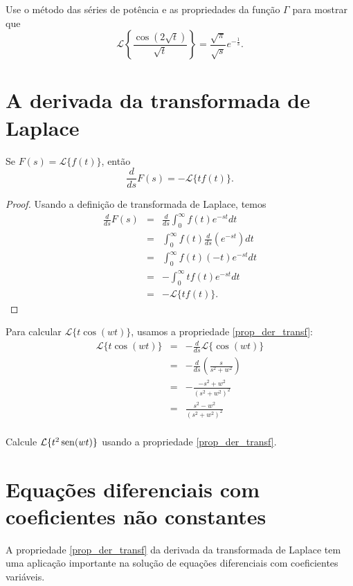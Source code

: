



\begin{prob}Use o método das séries de potência e as propriedades da função $\Gamma$ para mostrar que
$$
\mathcal{L}\left\{\frac{\cos(2\sqrt{t})}{\sqrt{t}}\right\}=\frac{\sqrt{\pi}}{\sqrt{s}}e^{-\frac{1}{s}}.
$$
\end{prob}

\section{A derivada da transformada de Laplace}
\begin{propr}{\label{prop_der_transf}}
Se $F(s)=\mathcal{L}\{f(t)\}$, então
\begin{equation}
\frac{d}{ds}F(s)=-\mathcal{L}\{tf(t)\}.
\end{equation} 
\end{propr}
\begin{proof}
Usando a definição de transformada de Laplace, temos
\begin{eqnarray*}
\frac{d}{ds}F(s)&=&\frac{d}{ds}\int_0^\infty f(t) e^{-st}dt\\
&=&\int_0^\infty f(t) \frac{d}{ds}\left(e^{-st}\right)dt\\
&=&\int_0^\infty f(t) (-t)e^{-st}dt\\
&=&-\int_0^\infty tf(t) e^{-st}dt\\
&=&-\mathcal{L}\{tf(t)\}.
\end{eqnarray*}
\end{proof}

\begin{ex}Para calcular $\mathcal{L}\{t\cos(wt)\}$, usamos a propriedade \ref{prop_der_transf}:
\begin{eqnarray*}
\mathcal{L}\{t\cos(wt)\}&=&-\frac{d}{ds}\mathcal{L}\{\cos(wt)\}\\
&=&-\frac{d}{ds}\left(\frac{s}{s^2+w^2}\right)\\
&=&-\frac{-s^2+w^2}{(s^2+w^2)^2}\\
&=&\frac{s^2-w^2}{(s^2+w^2)^2}\\
\end{eqnarray*}
\end{ex}
\begin{prob}Calcule $\mathcal{L}\{t^2\operatorname{sen}(wt)\}$ usando a propriedade \ref{prop_der_transf}.
\end{prob}


\section{Equações diferenciais com coeficientes não constantes}
A propriedade \ref{prop_der_transf} da derivada da transformada de Laplace tem uma aplicação importante na solução de equações diferenciais com coeficientes variáveis.

